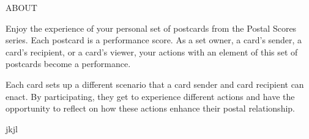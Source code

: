 \documentclass[10pt]{book}
\newcommand{\seriesTitle}{\Huge{P}\huge{OSTAL} \Huge{S}\huge{CORES}}
\newcommand{\setNumberStart}{0}
\newcommand{\setNumberEnd}{20}
\newcommand{\runDate}{20200612}
\newcommand{\multipleNum}{7}
\newcommand{\iterationNumber}{1}
\begin{document}
\begin{center}
\large{ABOUT}\\

\medskip

\small{Enjoy the experience of your personal set of postcards from the Postal Scores series. Each postcard is a performance score. As a set owner, a card's sender, a card's recipient,  or a card's viewer, your actions with an element of this set of postcards become a performance. \\

\medskip

Each card sets up a different scenario that a card sender and card recipient can enact. By participating, they get to experience different actions and have the opportunity to reflect on how these actions enhance their postal relationship.\\}
\end{center}


\newpage
jkjl
\end{document}
